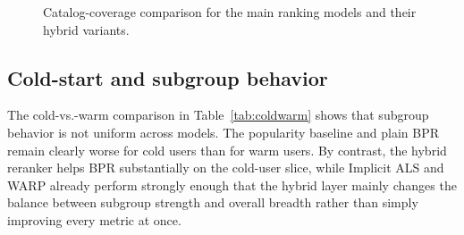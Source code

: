 \documentclass[sigconf,nonacm]{acmart}
\begin{document}
\begin{figure}[t]
  \centering
  \caption{Catalog-coverage comparison for the main ranking models and their hybrid variants.}
  \label{fig:coveragebars}
\end{figure}

\subsection{Cold-start and subgroup behavior}
The cold-vs.-warm comparison in Table~\ref{tab:coldwarm} shows that subgroup behavior is not uniform across models. The popularity baseline and plain BPR remain clearly worse for cold users than for warm users. By contrast, the hybrid reranker helps BPR substantially on the cold-user slice, while Implicit ALS and WARP already perform strongly enough that the hybrid layer mainly changes the balance between subgroup strength and overall breadth rather than simply improving every metric at once.

\begin{table}[t]
  \caption{Cold-user vs.\ warm-user NDCG@10. Positive gap means warm users outperform cold users; negative gap means the cold-user slice scored higher in this benchmark sample.}
  \label{tab:coldwarm}
  \centering
  \footnotesize
  \setlength{\tabcolsep}{5pt}
\end{table}
\end{document}
